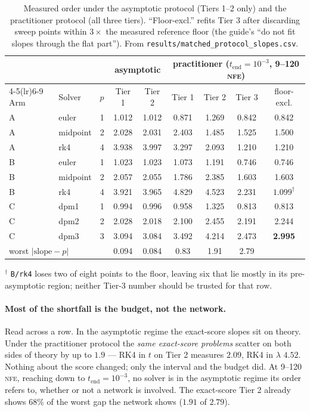 \documentclass[11pt,a4paper]{article}
\newcommand{\NFE}{\textsc{nfe}}
\newcommand{\lam}{\lambda}
\begin{document}
\begin{table}[t]
\centering
\caption{Measured order under the asymptotic protocol (Tiers 1--2 only) and the
practitioner protocol (all three tiers). ``Floor-excl.'' refits Tier 3 after
discarding sweep points within $3\times$ the measured reference floor (the guide's
``do not fit slopes through the flat part''). From
\texttt{results/matched\_protocol\_slopes.csv}.}
\label{tab:order3}
\small
\begin{tabular}{llc cc ccc c}
\toprule
 & & & \multicolumn{2}{c}{asymptotic} & \multicolumn{4}{c}{practitioner ($t_{\text{end}}=10^{-3}$, 9--120 \NFE)} \\
\cmidrule(lr){4-5}\cmidrule(lr){6-9}
Arm & Solver & $p$ & Tier 1 & Tier 2 & Tier 1 & Tier 2 & Tier 3 & floor-excl. \\
\midrule
A & euler    & 1 & 1.012 & 1.012 & 0.871 & 1.269 & 0.842 & 0.842 \\
A & midpoint & 2 & 2.028 & 2.031 & 2.403 & 1.485 & 1.525 & 1.500 \\
A & rk4      & 4 & 3.938 & 3.997 & 3.297 & 2.093 & 1.210 & 1.210 \\
\midrule
B & euler    & 1 & 1.023 & 1.023 & 1.073 & 1.191 & 0.746 & 0.746 \\
B & midpoint & 2 & 2.057 & 2.055 & 1.786 & 2.385 & 1.603 & 1.603 \\
B & rk4      & 4 & 3.921 & 3.965 & 4.829 & 4.523 & 2.231 & $1.099^{\dagger}$ \\
\midrule
C & dpm1     & 1 & 0.994 & 0.996 & 0.958 & 1.325 & 0.813 & 0.813 \\
C & dpm2     & 2 & 2.028 & 2.018 & 2.100 & 2.455 & 2.191 & 2.244 \\
C & dpm3     & 3 & 3.094 & 3.084 & 3.492 & 4.214 & 2.473 & \textbf{2.995} \\
\midrule
\multicolumn{3}{l}{worst $|\text{slope}-p|$} & 0.094 & 0.084 & 0.83 & 1.91 & 2.79 & \\
\bottomrule
\end{tabular}

\vspace{2pt}
{\footnotesize $^{\dagger}$ \texttt{B/rk4} loses two of eight points to the
floor, leaving six that lie mostly in its pre-asymptotic region; neither Tier-3
number should be trusted for that row.}
\end{table}

\paragraph{Most of the shortfall is the budget, not the network.} Read across a
row. In the asymptotic regime the exact-score slopes sit on theory. Under the
practitioner protocol the \emph{same exact-score problems} scatter on both sides of
theory by up to $1.9$ --- RK4 in $t$ on Tier 2 measures $2.09$, RK4 in $\lam$ $4.52$.
Nothing about the score changed; only the interval and the budget did. At 9--120
\NFE, reaching down to $t_{\text{end}}=10^{-3}$, no solver is in the asymptotic
regime its order refers to, whether or not a network is involved. The exact-score
Tier 2 already shows $68\%$ of the worst gap the network shows ($1.91$ of $2.79$).
\end{document}
